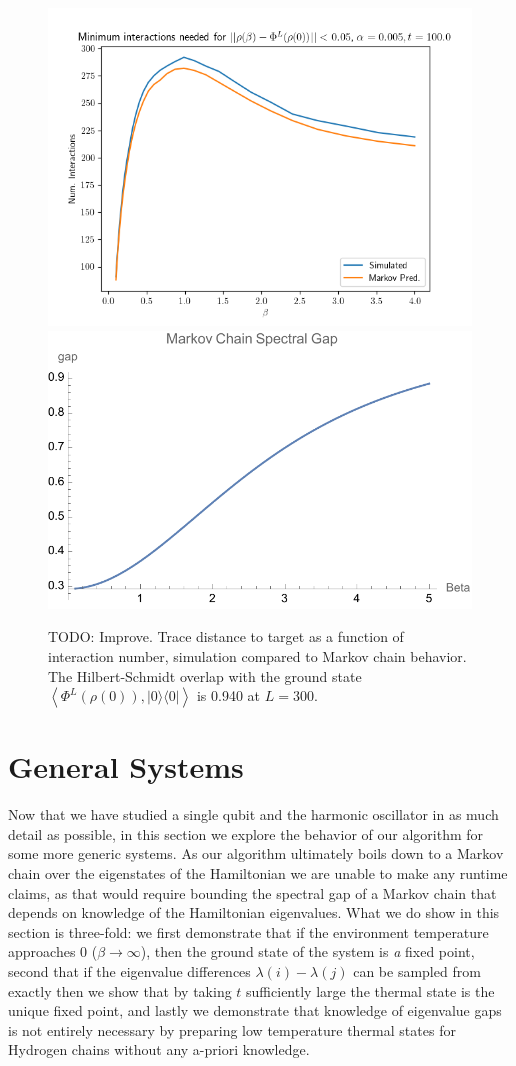 \documentclass{article}
\newcommand{\ketbra}[2]{| #1\rangle\! \langle #2|}
\newcommand{\anglebrackets}[1]{\left< #1 \right>}
\begin{document}
\begin{figure}
    \centering
    \includegraphics[width=0.45\linewidth]{numerics/data/sho_l_vs_beta.png}
    \includegraphics[width=0.5\linewidth]{numerics/data/spec_gap_dim_4.pdf}
    \caption{TODO: Improve. Trace distance to target as a function of interaction number, simulation compared to Markov chain behavior. The Hilbert-Schmidt overlap with the ground state $\anglebrackets{\Phi^L(\rho(0)), \ketbra{0}{0}}$ is 0.940 at $L = 300$. }
    \label{fig:sho_total_time_vs_beta}
\end{figure}




\section{General Systems}
 Now that we have studied a single qubit and the harmonic oscillator in as much detail as possible, in this section we explore the behavior of our algorithm for some more generic systems. As our algorithm ultimately boils down to a Markov chain over the eigenstates of the Hamiltonian we are unable to make any runtime claims, as that would require bounding the spectral gap of a Markov chain that depends on knowledge of the Hamiltonian eigenvalues. What we do show in this section is three-fold: we first demonstrate that if the environment temperature approaches 0 ($\beta \to \infty$), then the ground state of the system is \emph{a} fixed point, second that if the eigenvalue differences $\lambda(i) - \lambda(j)$ can be sampled from exactly then we show that by taking $t$ sufficiently large the thermal state is the unique fixed point, and lastly we demonstrate that knowledge of eigenvalue gaps is not entirely necessary by preparing low temperature thermal states for Hydrogen chains without any a-priori knowledge.
\end{document}
